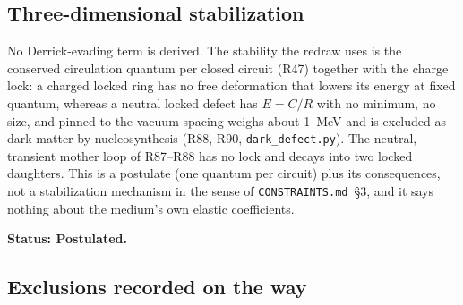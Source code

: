 \documentclass[11pt,a4paper]{article}
\theoremstyle{plain}
\theoremstyle{remark}
\newcommand{\status}[1]{\medskip\noindent\textbf{Status: #1.}\ }
\begin{document}
\subsection{Three-dimensional stabilization}\label{sec:stabilization}

No Derrick-evading term is derived. The stability the redraw uses is the conserved circulation
quantum per closed circuit (R47) together with the charge lock: a charged locked ring has no
free deformation that lowers its energy at fixed quantum, whereas a neutral locked defect has
$E = C/R$ with no minimum, no size, and pinned to the vacuum spacing weighs about 1~MeV and is
excluded as dark matter by nucleosynthesis (R88, R90, \texttt{dark\_defect.py}). The neutral,
transient mother loop of R87--R88 has no lock and decays into two locked daughters. This is a
postulate (one quantum per circuit) plus its consequences, not a stabilization mechanism in the
sense of \texttt{CONSTRAINTS.md}~\S3, and it says nothing about the medium's own elastic
coefficients.

\status{Postulated}

\subsection{Exclusions recorded on the way}\label{sec:exclusions}
\end{document}
